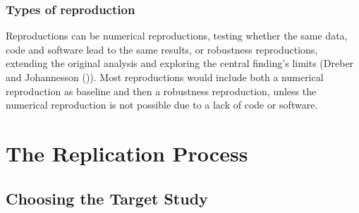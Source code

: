 \documentclass[
  letterpaper,
  DIV=11,
  openany,
  fontsize=12pt,
  parskip=half,
  headings=big,
  numbers=noenddot,
  titlepage=false]{scrreprt}
\begin{document}
\section{Types of reproduction}\label{types-of-reproduction}

Reproductions can be numerical reproductions, testing whether the same
data, code and software lead to the same results, or robustness
reproductions, extending the original analysis and exploring the central
finding's limits (Dreber and Johannesson
()). Most reproductions would
include both a numerical reproduction as baseline and then a robustness
reproduction, unless the numerical reproduction is not possible due to a
lack of code or software.

\part{The Replication Process}

\chapter{Choosing the Target Study}\label{choosing-the-target-study}
\end{document}
